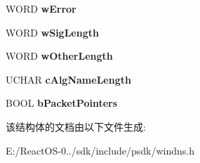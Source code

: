 \begin{DoxyCompactItemize}
W\+O\+RD {\bfseries w\+Error}
\item 
\mbox{\label{struct_d_n_s___t_s_i_g___d_a_t_a_a_aec148fea7bc0afe0f03779c27c775cf0}} 
W\+O\+RD {\bfseries w\+Sig\+Length}
\item 
\mbox{\label{struct_d_n_s___t_s_i_g___d_a_t_a_a_a951d45bcb1caca780441ed58991030e3}} 
W\+O\+RD {\bfseries w\+Other\+Length}
\item 
\mbox{\label{struct_d_n_s___t_s_i_g___d_a_t_a_a_a3c4eac031f213b841445d851074ff6eb}} 
U\+C\+H\+AR {\bfseries c\+Alg\+Name\+Length}
\item 
\mbox{\label{struct_d_n_s___t_s_i_g___d_a_t_a_a_a48db1f5fa8385b0f879ba41f7ae1460d}} 
B\+O\+OL {\bfseries b\+Packet\+Pointers}
\end{DoxyCompactItemize}


该结构体的文档由以下文件生成\+:\begin{DoxyCompactItemize}
\item 
E\+:/\+React\+O\+S-\/0../sdk/include/psdk/windns.\+h\end{DoxyCompactItemize}

